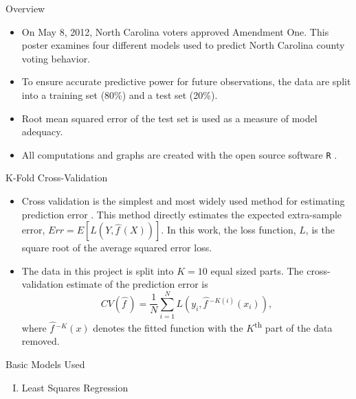 \documentclass[final]{beamer}\usepackage[]{graphicx}\usepackage[]{color}
\begin{document}
\begin{frame}[fragile]
\begin{columns}[t]
\begin{column}{0.23\linewidth}
\begin{minipage}[t][.955\textheight]{\linewidth}
\vspace{0ex}
\begin{block}{Overview}
\begin{itemize}
\item On May 8, 2012, North Carolina voters approved Amendment One.  This poster examines four different models used to predict North Carolina county voting behavior.  
\item To ensure accurate predictive power for future observations, the data are split into a training set (80\%) and a test set (20\%). 
\item Root mean squared error of the test set is used as a measure of model adequacy.  
\item All computations and graphs are created with the open source software \texttt{R} \cite{R-base}. 
\end{itemize}
\vspace{0ex}
\end{block}
\vfill

\begin{block}{K-Fold Cross-Validation}
\begin{itemize}
\item Cross validation is the simplest and most widely used method for estimating prediction error \cite{JF09}.  This method directly estimates the expected extra-sample error, $Err = E[{L(Y, \hat{f\,}\!(X))}]$.  In this work, the loss function, $L$, is the square root of the average squared error loss.
\vspace{2ex}
\item The data in this project is split into $K=10$ equal sized parts.  The cross-validation estimate of the prediction error is $$CV(\hat{f\,}\!)=\frac{1}{N}\sum_{i=1}^{N}L(y_i, \hat{f\,}\!^{-K(i)}(x_i)),$$
where $\hat{f\,}\!^{-K}(x)$ denotes the fitted function with the $K$\textsuperscript{th} part of the data removed.
\end{itemize}
\vspace{0ex}
\vfill
\end{block}
\vfill

\begin{block}{Basic Models Used}

\begin{enumerate}[I.]
\item Least Squares Regression
\vspace{0ex}


\end{enumerate}
\end{block}
\end{minipage}
\end{column}
\end{columns}
\end{frame}
\end{document}
